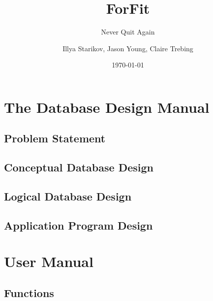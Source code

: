 \documentclass[oneside]{scrbook}
\title{ForFit}
\subtitle{Never Quit Again}
\author{Illya Starikov, Jason Young, Claire Trebing}
\date{\today}
\begin{document}
\maketitle

\part{The Database Design Manual}
\chapter{Problem Statement}


\chapter{Conceptual Database Design}


\chapter{Logical Database Design}


\chapter{Application Program Design}


\part{User Manual}

\chapter{Functions}






\end{document}

